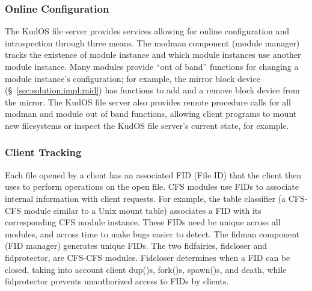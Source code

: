 \subsubsection{Online Configuration}
\label{sec:solution:arch:online}


The KudOS file server provides services allowing for online configuration
and introspection through three means. The modman component (module
manager) tracks the existence of module instance and which module instances use
another module instance. Many modules provide ``out of band'' functions for
changing a module instance's configuration; for example, the mirror block
device (\S~\ref{sec:solution:impl:raid}) has functions to add and a remove block
device from the mirror. The KudOS file server also provides remote procedure
calls for all modman and module out of band functions, allowing client
programs to mount new filesystems or inspect the KudOS file server's
current state, for example.

\subsubsection{Client Tracking}
\label{sec:solution:arch:clients}

Each file opened by a client has an associated FID (File ID) that the client
then uses to perform operations on the open file. CFS modules use FIDs to
associate internal information with client requests. For example, the table
classifier (a CFS-CFS module similar to a Unix mount table) associates a FID
with its corresponding CFS module instance. These FIDs need be unique across all
modules, and across time to make bugs easier to detect. The fidman component
(FID manager) generates unique FIDs. The two fidfairies, fidcloser and
fidprotector, are CFS-CFS modules. Fidcloser determines when a FID can be
closed, taking into account client dup()s, fork()s, spawn()s, and death, while
fidprotector prevents unauthorized access to FIDs by clients.
